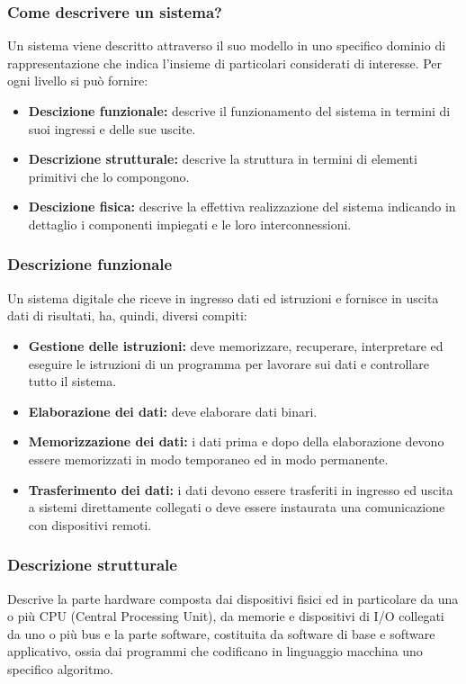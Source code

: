 \documentclass{article}
\begin{document}
\subsubsection{Come descrivere un sistema?}
Un sistema viene descritto attraverso il suo modello in uno specifico dominio di rappresentazione che indica l’insieme di particolari considerati di interesse. Per ogni livello si può fornire:
\begin{itemize}
    \item \textbf{Descizione funzionale:} descrive il funzionamento del sistema in termini di suoi ingressi e delle sue uscite.
    \item \textbf{Descrizione strutturale:} descrive la struttura in termini di elementi primitivi che lo compongono.
    \item \textbf{Descizione fisica:} descrive la effettiva realizzazione del sistema indicando in dettaglio i componenti impiegati e le loro interconnessioni.
\end{itemize}

\subsubsection{Descrizione funzionale}
Un sistema digitale che riceve in ingresso dati ed istruzioni e fornisce in uscita dati di risultati, ha, quindi, diversi compiti:
\begin{itemize}
    \item \textbf{Gestione delle istruzioni:} deve memorizzare, recuperare, interpretare ed eseguire le istruzioni di un programma per lavorare sui dati e controllare tutto il sistema.
    \item \textbf{Elaborazione dei dati:} deve elaborare dati binari.
    \item \textbf{Memorizzazione dei dati:} i dati prima e dopo della elaborazione devono essere memorizzati in modo temporaneo ed in modo permanente.
    \item \textbf{Trasferimento dei dati:} i dati devono essere trasferiti in ingresso ed uscita a sistemi direttamente collegati o deve essere instaurata una comunicazione con dispositivi remoti.
\end{itemize}

\subsubsection{Descrizione strutturale}
Descrive la parte hardware composta dai dispositivi fisici ed in particolare da una o più CPU (Central Processing Unit), da memorie e dispositivi di I/O collegati da uno o più bus e la parte software, costituita da software di base e software applicativo, ossia dai programmi che codificano in linguaggio macchina uno specifico algoritmo.
\end{document}
